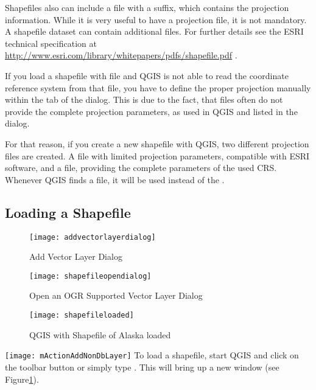 Shapefiles also can include a file with a  suffix, which contains
the projection information. While it is very useful to have a projection file, it is not mandatory. A shapefile dataset can contain additional files. For further details see the ESRI technical specification at \url{http://www.esri.com/library/whitepapers/pdfs/shapefile.pdf} .


If you load a shapefile with  file and QGIS is not 
able to read the coordinate reference system from that file, you have to define the 
proper projection manually within the  tab of the  dialog. This is due to the fact, that  files often  
do not provide the complete projection parameters, as used in QGIS and listed in 
the  dialog. 

For that reason, if you create a new shapefile with QGIS, two different projection 
files are created. A  file with limited projection parameters, 
compatible with ESRI software, and a  file, providing the complete 
parameters of the used CRS. Whenever QGIS finds a  file, it will be 
used instead of the .

\subsection{Loading a Shapefile}\label{sec:load_shapefile}

\begin{figure}[ht]
   \centering
   \caption{Add Vector Layer Dialog \nixcaption}\label{fig:addvectorlayer}
   \texttt{[image: addvectorlayerdialog]}
\end{figure}

\begin{figure}[ht]
   \centering
   \caption{Open an OGR Supported Vector Layer Dialog \nixcaption}\label{fig:openshapefile}
   \texttt{[image: shapefileopendialog]}
\end{figure}

\begin{figure}[ht]
   \centering
   \caption{QGIS with Shapefile of Alaska loaded \nixcaption}\label{fig:loadedshapefile}
   \texttt{[image: shapefileloaded]}
\end{figure}

\texttt{[image: mActionAddNonDbLayer]} To load a shapefile, start
QGIS and click on the 
toolbar button or simply type . 
This will bring up a new window (see Figure\ref{fig:addvectorlayer}).  


